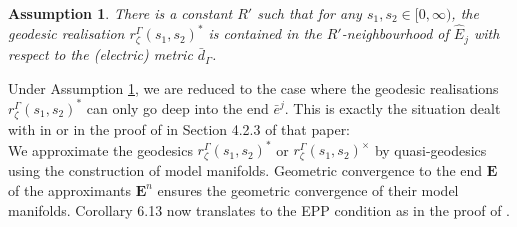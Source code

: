 \documentclass{amsart}
\newtheorem{assumption}[theorem]{Assumption}
\theoremstyle{definition}
\newcommand\HHH{{\mathbb H}}
\begin{document}
\begin{comment}
Now, we shall show that geodesic arcs connecting two points of $r_\zeta^\Gamma$ cannot go out only from $E$ with respect to the metric $\bar d_\Gamma$.
Let $r_\zeta^\Gamma(s_1, s_2)^*$ be the geodesic arc in $\HHH^3$ connecting $r_\zeta^\Gamma(s_1)$ with $r_\zeta^\Gamma(s_2)$, and $r_\zeta^\Gamma(s_1,s_2)^\times$ be the one with respect to the electric metric $\bar d_\Gamma$.
\end{comment}
\begin{assumption}\label{ms2assume}
There is a constant $R'$ such that for any $s_1, s_2  \in [0,\infty)$, the geodesic realisation $r_\zeta^\Gamma(s_1, s_2)^*$  is contained in the $R'$-neighbourhood of $\hat E_j$ with respect to the (electric) metric $\bar d_\Gamma$.
\end{assumption}
\begin{comment}
Since $r_\zeta^\Gamma$ is the projection of $\Phi_\infty \circ r_\zeta$ by $q$, the geodesic arc $r_\zeta^\Gamma(s_1, s_2)^*$ is the image of the geodesic arc connecting $\Phi_\infty \circ r_\zeta(s_1)$ with $\Phi_\infty \circ r_\zeta(s_2)$, which we denote by $r_\zeta^\infty(s_1, s_2)$.
Since $(\HHH^3/G_\infty^j)_0$ has only one geometrically infinite end $\bar e_j$, we see that there is $R'$ such that $r_\zeta^\infty(s_1,s_2)^* \cap (\HHH^3/G_\infty^j)_0$ is contained in a $R'$-neighbourhood of $\bar E_j$.
Projecting this to the geometric limit $\HHH^3/\Gamma^j$, we see that $r_\zeta^\Gamma(s_1, s_2)^*$ is contained in the $R'$-neighbourhood of $\hat E_j$ with respect to $\bar d_\Gamma$.
Since $r_\zeta^\Gamma(s_1,s_2)^\times$ uniformly fellow-travels $r_\zeta^\Gamma(s_1, s_2)^*$ with respect to $\bar d_\Gamma$, we have thus completed the proof.
\end{proof}
\end{comment}

Under Assumption \ref{ms2assume}, we are reduced to the case where the geodesic realisations $r_\zeta^\Gamma(s_1,s_2)^*$ can only go deep into  the end  $\bar e^j$. This is exactly the situation dealt with in \cite[Corollary 6.13]{mahan-split} or in the proof of \cite[Theorem A]{mahan-series2} in Section 4.2.3 of that paper:\\
We approximate the geodesics $r_\zeta^\Gamma(s_1,s_2)^*$ or $r_\zeta^\Gamma(s_1, s_2)^\times$ by quasi-geodesics using the construction of model manifolds. Geometric convergence to the end $\mathbf{E}$ of the approximants $\mathbf{E}^n$ ensures the geometric convergence of their model manifolds. Corollary 6.13 \cite{mahan-split}  now translates to the EPP condition as in the proof of \cite[Theorem A]{mahan-series2}.
\end{document}
